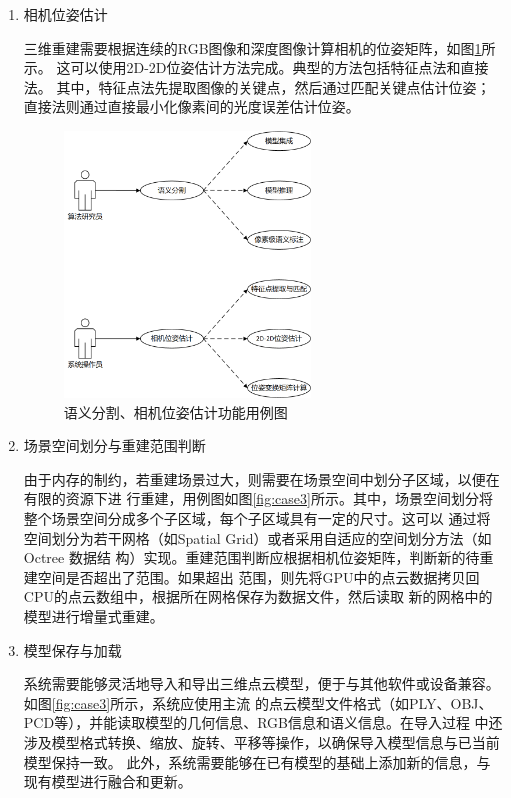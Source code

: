 \begin{enumerate}
	\item{相机位姿估计}
	\par 三维重建需要根据连续的RGB图像和深度图像计算相机的位姿矩阵，如图\ref{fig:case2}所示。
	这可以使用2D-2D位姿估计方法完成。典型的方法包括特征点法和直接法。
	其中，特征点法先提取图像的关键点，然后通过匹配关键点估计位姿；直接法则通过直接最小化像素间的光度误差估计位姿。

	\begin{figure}[htb]
		\centering
		\includegraphics[width=0.618\textwidth]{figures/uml/case2.png}
		\caption{语义分割、相机位姿估计功能用例图}
		\label{fig:case2}
	\end{figure}

	\item{场景空间划分与重建范围判断}
	\par 由于内存的制约，若重建场景过大，则需要在场景空间中划分子区域，以便在有限的资源下进
	行重建，用例图如图\ref{fig:case3}所示。其中，场景空间划分将整个场景空间分成多个子区域，每个子区域具有一定的尺寸。这可以
	通过将空间划分为若干网格（如Spatial Grid）或者采用自适应的空间划分方法（如 Octree 数据结
	构）实现。重建范围判断应根据相机位姿矩阵，判断新的待重建空间是否超出了范围。如果超出
	范围，则先将GPU中的点云数据拷贝回CPU的点云数组中，根据所在网格保存为数据文件，然后读取
	新的网格中的模型进行增量式重建。

	\item{模型保存与加载}
	\par 系统需要能够灵活地导入和导出三维点云模型，便于与其他软件或设备兼容。如图\ref{fig:case3}所示，系统应使用主流
	的点云模型文件格式（如PLY、OBJ、PCD等），并能读取模型的几何信息、RGB信息和语义信息。在导入过程
	中还涉及模型格式转换、缩放、旋转、平移等操作，以确保导入模型信息与已当前模型保持一致。
	此外，系统需要能够在已有模型的基础上添加新的信息，与现有模型进行融合和更新。


\end{enumerate}
